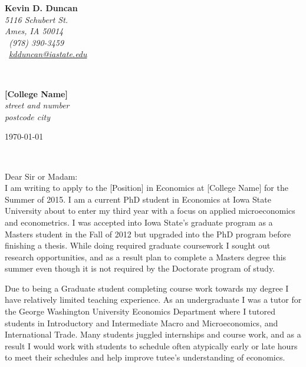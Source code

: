 \documentclass[11pt]{article}
\begin{document}
\sffamily   %
\hfill%
\begin{minipage}[t]{.6\textwidth}
\raggedleft%
{\bfseries Kevin D. Duncan}\\[.35ex]
\small\itshape%
5116 Schubert St.\\
Ames, IA 50014\\[.35ex]
\Telefon~(978) 390-3459\\
\Letter~\href{mailto:kdduncan@iastate.edu}{kdduncan@iastate.edu}
\end{minipage}\\[1em]
%
\begin{minipage}[t]{.4\textwidth}
\raggedright%
{\bfseries [College Name]}\\[.35ex]
\small\itshape%
street and number\\
postcode city
\end{minipage}
\hfill %
\begin{minipage}[t]{.4\textwidth}
\raggedleft %
\today

\end{minipage}\\[2em]
\raggedright
Dear Sir or Madam:\\[1.5em]
%
I am writing to apply to the [Position] in Economics at [College Name] for the Summer of 2015. I am a current PhD student in Economics at Iowa State University about to enter my third year with a focus on applied microeconomics and econometrics. I was accepted into Iowa State's graduate program as a Masters student in the Fall of 2012 but upgraded into the PhD program before finishing a thesis. While doing required graduate coursework I sought out research opportunities, and as a result plan to complete a Masters degree this summer even though it is not required by the Doctorate program of study.

Due to being a Graduate student completing course work towards my degree I have relatively limited teaching experience. As an undergraduate I was a tutor for the George Washington University Economics Department where I tutored students in Introductory and Intermediate Macro and Microeconomics, and International Trade. Many students juggled internships and course work, and as a result I would work with students to schedule often atypically early or late hours to meet their schedules and help improve tutee's understanding of economics.
\end{document}
